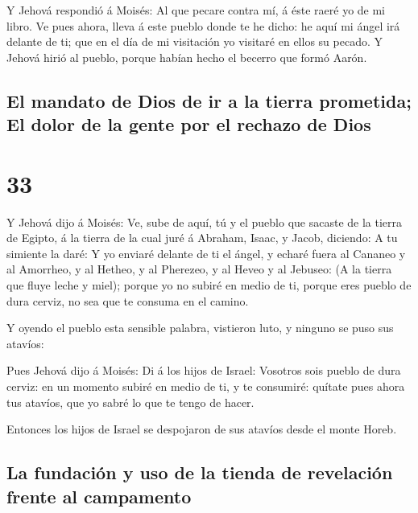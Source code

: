  Y Jehová respondió á Moisés: Al que pecare contra mí, á
éste raeré yo de mi libro.  Ve pues ahora, lleva á este
pueblo donde te he dicho: he aquí mi ángel irá delante de ti; que en el
día de mi visitación yo visitaré en ellos su pecado.  Y
Jehová hirió al pueblo, porque habían hecho el becerro que formó Aarón.

\hypertarget{el-mandato-de-dios-de-ir-a-la-tierra-prometida-el-dolor-de-la-gente-por-el-rechazo-de-dios}{%
\subsection{El mandato de Dios de ir a la tierra prometida; El dolor de
la gente por el rechazo de
Dios}\label{el-mandato-de-dios-de-ir-a-la-tierra-prometida-el-dolor-de-la-gente-por-el-rechazo-de-dios}}

\hypertarget{section-02-33}{%
\section{33}\label{section-02-33}}

 Y Jehová dijo á Moisés: Ve, sube de aquí, tú y el pueblo
que sacaste de la tierra de Egipto, á la tierra de la cual juré á
Abraham, Isaac, y Jacob, diciendo: A tu simiente la daré: 
Y yo enviaré delante de ti el ángel, y echaré fuera al Cananeo y al
Amorrheo, y al Hetheo, y al Pherezeo, y al Heveo y al Jebuseo:
 (A la tierra que fluye leche y miel); porque yo no subiré
en medio de ti, porque eres pueblo de dura cerviz, no sea que te consuma
en el camino.

 Y oyendo el pueblo esta sensible palabra, vistieron luto,
y ninguno se puso sus atavíos:

 Pues Jehová dijo á Moisés: Di á los hijos de Israel:
Vosotros sois pueblo de dura cerviz: en un momento subiré en medio de
ti, y te consumiré: quítate pues ahora tus atavíos, que yo sabré lo que
te tengo de hacer.

 Entonces los hijos de Israel se despojaron de sus atavíos
desde el monte Horeb.

\hypertarget{la-fundaciuxf3n-y-uso-de-la-tienda-de-revelaciuxf3n-frente-al-campamento}{%
\subsection{La fundación y uso de la tienda de revelación frente al
campamento}\label{la-fundaciuxf3n-y-uso-de-la-tienda-de-revelaciuxf3n-frente-al-campamento}}

